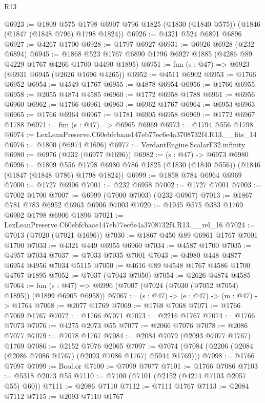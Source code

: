 \begin{lexlean}{R13}
\begin{coremodule}
@6923 := @1809
    @575
    @1798
    @6907
    @796
    @1825
    (@1830 (@1840 @575))
    (@1846 (@1847 (@1848 @796) @1798 @1824))
@6926 := @4321 @524 @6891 @6896
@6927 := @4267 @1700
@6928 := @1797 @6927
@6931 := @6926 @6928 (@232 @6894)
@6945 := @1868 @523 @1767 @6890 @1796 @6927 @1885 (@4286 @89 @4229 @1767 @4266 @1700 @4490 @1895)
@6951 := fun (s : @47) => @6923 (@6931 @6945 (@2626 @1696 @4265))
@6952 := @4511 @6902
@6953 := @1766 @6952
@6954 := @4549 @1767
@6955 := @4878 @6954
@6956 := @1766 @6955
@6958 := @2055 @4874 @4585
@6960 := @1772 @6958 @1788
@6961 := @6956 @6960
@6962 := @1766 @6961
@6963 := @6962 @1767
@6964 := @6953 @6963
@6965 := @1766 @6964
@6967 := @1781 @6905 @6958
@6969 := @1772 @6967 @1788
@6971 := fun (s : @47) => @6965 @6969
@6973 := @1794 @556 @1798
@6974 := LexLeanPreserve.C60ebfcbaae147eb77ec6e4a3708732f4.R13.__fits_14
@6976 := @1800 (@6974 @1696)
@6977 := VerdantEngine.ScalarF32.infinity
@6980 := @6976 (@232 (@6977 @1696))
@6982 := (s : @47) -> @6973 @6980
@6996 := @1809
    @556
    @1798
    @6980
    @786
    @1825
    (@1830 (@1840 @556))
    (@1846 (@1847 (@1848 @786) @1798 @1824))
@6999 := @1858 @784 @6964 @6969
@7000 := @1727 @6906
@7001 := @232 @6958
@7002 := @1727 @7001
@7003 := @7002 @1700
@7007 := @6999 (@7000 @7003) (@232 @6967)
@7013 := @1867 @781 @783 @6952 @6963 @6906 @7003
@7020 := @1945 @575 @383 @1769 @6902 @1798 @6906 @1896
@7021 := LexLeanPreserve.C60ebfcbaae147eb77ec6e4a3708732f4.R13.__rel_16
@7024 := @7013 (@7020 (@7021 @1696))
@7030 := @1867 @450 @89 @6961 @1767 @7001 @1700
@7033 := @4321 @449 @6955 @6960
@7034 := @4587 @1700
@7035 := @4957 @7034
@7037 := @7033 @7035 @7001
@7043 := @4980 @448 @4877 @6954 @4956 @7034 @5115
@7050 := @4616 @89 @4548 @1767 @4586 @1700 @4767 @1895
@7052 := @7037 (@7043 @7050)
@7054 := @2626 @4874 @4585
@7064 := fun (s : @47) => @6996 (@7007 (@7024 (@7030 (@7052 @7054) @1895)) (@1899 @6905 @6958))
@7067 := (s : @47) -> (e : @47) -> (m : @47) -> @1764
@7068 := @2077 @1769
@7069 := @1768 @7068
@7071 := @1766 @7069 @1767
@7072 := @1766 @7071
@7073 := @2216 @1767
@7074 := @1766 @7073
@7076 := @4275 @2073 @55
@7077 := @2066 @7076
@7078 := @2086 @7077
@7079 := @7078 @1767
@7084 := @2084 @7079 (@2093 @7077 @1767) @1769
@7086 := @2152 @7076 @2065
@7097 := @7074 (@7084 (@2206 (@2084 (@2086 @7086 @1767) (@2093 @7086 @1767) @5944 @1769)))
@7098 := @1766 @7097
@7099 := Bool.or
@7100 := @7099 @7077
@7101 := @1766 @7086
@7103 := @5318 @2073 @55
@7110 := @7100 (@7101 (@2152 (@4274 @7103 @2057 @55) @60))
@7111 := @2086 @7110
@7112 := @7111 @1767
@7113 := @2084 @7112
@7115 := @2093 @7110 @1767

\end{coremodule}
\end{lexlean}
